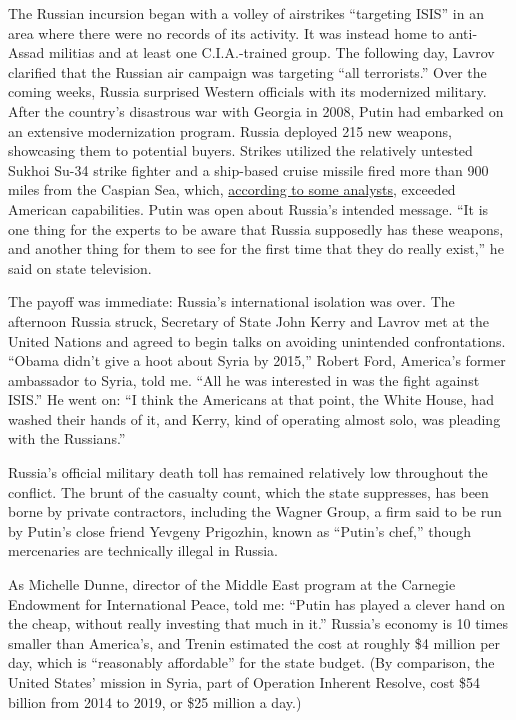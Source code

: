 The Russian incursion began with a volley of airstrikes ``targeting
ISIS'' in an area where there were no records of its activity. It was
instead home to anti-Assad militias and at least one C.I.A.-trained
group. The following day, Lavrov clarified that the Russian air campaign
was targeting ``all terrorists.'' Over the coming weeks, Russia
surprised Western officials with its modernized military. After the
country's disastrous war with Georgia in 2008, Putin had embarked on an
extensive modernization program. Russia deployed 215 new weapons,
showcasing them to potential buyers. Strikes utilized the relatively
untested Sukhoi Su-34 strike fighter and a ship-based cruise missile
fired more than 900 miles from the Caspian Sea, which,
\href{https://www.nytimes3xbfgragh.onion/2015/10/15/world/middleeast/russian-military-uses-syria-as-proving-ground-and-west-takes-notice.html}{according
to some analysts}, exceeded American capabilities. Putin was open about
Russia's intended message. ``It is one thing for the experts to be aware
that Russia supposedly has these weapons, and another thing for them to
see for the first time that they do really exist,'' he said on state
television.

The payoff was immediate: Russia's international isolation was over. The
afternoon Russia struck, Secretary of State John Kerry and Lavrov met at
the United Nations and agreed to begin talks on avoiding unintended
confrontations. ``Obama didn't give a hoot about Syria by 2015,'' Robert
Ford, America's former ambassador to Syria, told me. ``All he was
interested in was the fight against ISIS.'' He went on: ``I think the
Americans at that point, the White House, had washed their hands of it,
and Kerry, kind of operating almost solo, was pleading with the
Russians.''

Russia's official military death toll has remained relatively low
throughout the conflict. The brunt of the casualty count, which the
state suppresses, has been borne by private contractors, including the
Wagner Group, a firm said to be run by Putin's close friend Yevgeny
Prigozhin, known as ``Putin's chef,'' though mercenaries are technically
illegal in Russia.

As Michelle Dunne, director of the Middle East program at the Carnegie
Endowment for International Peace, told me: ``Putin has played a clever
hand on the cheap, without really investing that much in it.'' Russia's
economy is 10 times smaller than America's, and Trenin estimated the
cost at roughly \$4 million per day, which is ``reasonably affordable''
for the state budget. (By comparison, the United States' mission in
Syria, part of Operation Inherent Resolve, cost \$54 billion from 2014
to 2019, or \$25 million a day.)

